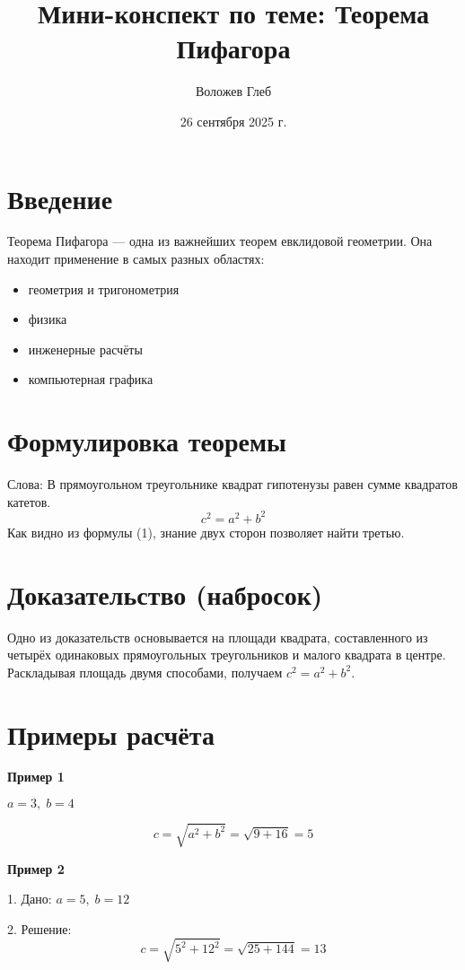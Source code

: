 \documentclass{article}
\title{Мини-конспект по теме: Теорема Пифагора}
\author{Воложев Глеб}
\date{26 сентября 2025 г.}
\begin{document}
\maketitle

\tableofcontents
\newpage

\section{Введение}
Теорема Пифагора — одна из важнейших теорем евклидовой геометрии. Она находит применение в самых разных областях:
\begin{itemize}
  \item геометрия и тригонометрия
  \item физика
  \item инженерные расчёты
  \item компьютерная графика
\end{itemize}

\section{Формулировка теоремы}
Слова: В прямоугольном треугольнике квадрат гипотенузы равен сумме квадратов катетов.
\begin{equation}
c^2 = a^2 + b^2
\end{equation}
Как видно из формулы (1), знание двух сторон позволяет найти третью.

\section{Доказательство (набросок)}
Одно из доказательств основывается на площади квадрата, составленного из четырёх одинаковых прямоугольных треугольников и малого квадрата в центре.  
Раскладывая площадь двумя способами, получаем $c^2 = a^2 + b^2$.

\section{Примеры расчёта}

\textbf{Пример 1}  

$a = 3, \; b = 4$  

\[
c = \sqrt{a^2 + b^2} = \sqrt{9 + 16} = 5
\]

\textbf{Пример 2}  

1. Дано: $a = 5, \; b = 12$  

2. Решение:  
\[
c = \sqrt{5^2 + 12^2} = \sqrt{25 + 144} = 13
\]
\end{document}
